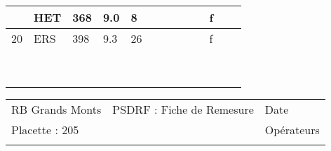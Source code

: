 \documentclass[a4paper, landscape]{article}\usepackage[]{graphicx}\usepackage[]{color}
\begin{document}
{\begin{tabular}{|p{1cm}|p{2cm}|p{1.6cm}|p{1.6cm}|p{1.6cm}|p{1.6cm}|p{1.5cm}|p{1.5cm}|p{1.5cm}|p{1.5cm}|p{1.5cm}|p{7.5cm}|p{5cm}|}
   \rowcolor[gray]{0.95} \hline
19 & HET & 368 & 9.0 & 8 &  &  &  &  &  & f &  &  \\ 
   \hline
20 & ERS & 398 & 9.3 & 26 &  &  &  &  &  & f &  &  \\ 
   \rowcolor[gray]{0.95} \hline
 &  &  &  &  &  &  &  &  &  &  &  &  \\ 
   \hline
 &  &  &  &  &  &  &  &  &  &  &  &  \\ 
   \rowcolor[gray]{0.95} \hline
 &  &  &  &  &  &  &  &  &  &  &  &  \\ 
   \hline
 &  &  &  &  &  &  &  &  &  &  &  &  \\ 
   \rowcolor[gray]{0.95} \hline
 &  &  &  &  &  &  &  &  &  &  &  &  \\ 
   \hline
 &  &  &  &  &  &  &  &  &  &  &  &  \\ 
   \rowcolor[gray]{0.95} \hline
 &  &  &  &  &  &  &  &  &  &  &  &  \\ 
   \hline
 &  &  &  &  &  &  &  &  &  &  &  &  \\ 
   \rowcolor[gray]{0.95} \hline
 &  &  &  &  &  &  &  &  &  &  &  &  \\ 
   \hline
\end{tabular}
}

\begin{tabular}{p{10cm}p{10cm}p{8cm}}
  RB Grands Monts & PSDRF : Fiche de Remesure & Date \\ 
  Placette : 205 &  & Opérateurs \\ 
   &  &  \\ 
  \end{tabular}
\end{document}
